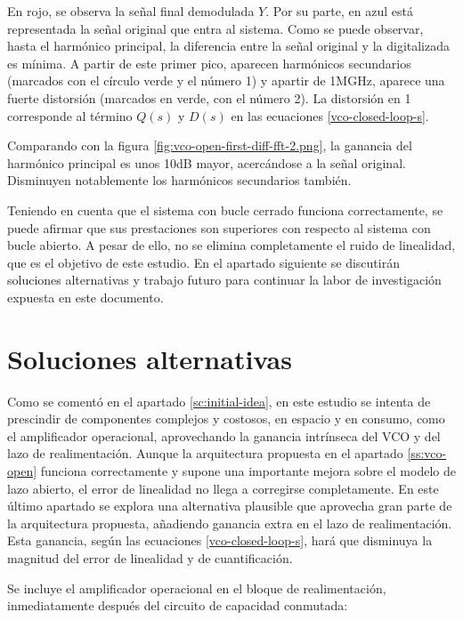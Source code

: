 \documentclass[12pt]{report} %
\begin{document}
	En rojo, se observa la señal final demodulada $Y$. Por su parte, en azul está representada la señal original que entra al sistema. Como se puede observar, hasta el harmónico principal, la diferencia entre la señal original y la digitalizada es mínima. A partir de este primer pico, aparecen harmónicos secundarios (marcados con el círculo verde y el número 1) y apartir de 1MGHz, aparece una fuerte distorsión (marcados en verde, con el número 2). La distorsión en 1 corresponde al término $Q(s)$ y $D(s)$ en las ecuaciones \ref{vco-closed-loop-s}.
	
	Comparando con la figura \ref{fig:vco-open-first-diff-fft-2.png}, la ganancia del harmónico principal es unos 10dB mayor, acercándose a la señal original. Disminuyen notablemente los harmónicos secundarios también.
	
	Teniendo en cuenta que el sistema con bucle cerrado funciona correctamente, se puede afirmar que sus prestaciones son superiores con respecto al sistema con bucle abierto. A pesar de ello, no se elimina completamente el ruido de linealidad, que es el objetivo de este estudio. En el apartado siguiente se discutirán soluciones alternativas y trabajo futuro para continuar la labor de investigación expuesta en este documento.
	
	\section{Soluciones alternativas}
	
	Como se comentó en el apartado \ref{sc:initial-idea}, en este estudio se intenta de prescindir de componentes complejos y costosos, en espacio y en consumo, como el amplificador operacional, aprovechando la ganancia intrínseca del VCO y del lazo de realimentación. Aunque la arquitectura propuesta en el apartado \ref{ss:vco-open} funciona correctamente y supone una importante mejora sobre el modelo de lazo abierto, el error de linealidad no llega a corregirse completamente. En este último apartado se explora una alternativa plausible que aprovecha gran parte de la arquitectura propuesta, añadiendo ganancia extra en el lazo de realimentación. Esta ganancia, según las ecuaciones \ref{vco-closed-loop-s}, hará que disminuya la magnitud del error de linealidad y de cuantificación.
	
	Se incluye el amplificador operacional en el bloque de realimentación, inmediatamente después del circuito de capacidad conmutada:
	
\end{document}
